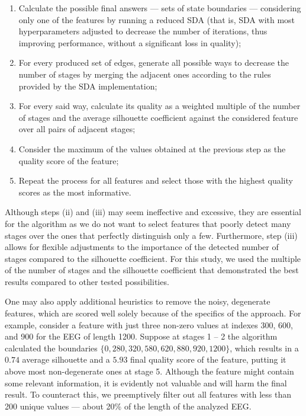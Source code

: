 \documentclass[10pt,lettersize,journal]{IEEEtran}
\begin{document}
\begin{enumerate}
    \item 
        Calculate the possible final answers --- sets of state boundaries --- considering only one of the features by running a reduced SDA (that is, SDA with most hyperparameters adjusted to decrease the number of iterations, thus improving performance, without a significant loss in quality);
    \item
        For every produced set of edges, generate all possible ways to decrease the number of stages by merging the adjacent ones according to the rules provided by the SDA implementation;
    \item
        For every said way, calculate its quality as a weighted multiple of the number of stages and the average silhouette coefficient against the considered feature over all pairs of adjacent stages;
    \item 
        Consider the maximum of the values obtained at the previous step as the quality score of the feature;
    \item
        Repeat the process for all features and select those with the highest quality scores as the most informative.
\end{enumerate}

Although steps (ii) and (iii) may seem ineffective and excessive, they are essential for the algorithm as we do not want to select features that poorly detect many stages over the ones that perfectly distinguish only a few. Furthermore, step (iii) allows for flexible adjustments to the importance of the detected number of stages compared to the silhouette coefficient. For this study, we used the multiple of the number of stages and the silhouette coefficient that demonstrated the best results compared to other tested possibilities.

One may also apply additional heuristics to remove the noisy, degenerate features, which are scored well solely because of the specifics of the approach. For example, consider a feature with just three non-zero values at indexes 300, 600, and 900 for the EEG of length 1200. Suppose at stages 1 -- 2 the algorithm calculated the boundaries $\{ 0, 280, 320, 580, 620, 880, 920, 1200 \}$, which results in a $0.74$ average silhouette and a $5.93$ final quality score of the feature, putting it above most non-degenerate ones at stage 5. Although the feature might contain some relevant information, it is evidently not valuable and will harm the final result. To counteract this, we preemptively filter out all features with less than 200 unique values --- about 20\% of the length of the analyzed EEG.
\end{document}
